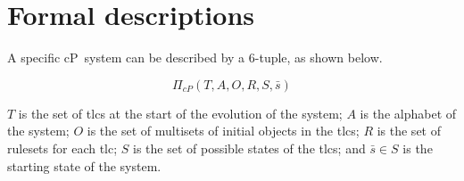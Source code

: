 \section{\label{sec:cps:formaldescriptions}Formal  descriptions}

A specific cP~system can be described by a 6-tuple, as shown below.

\[
\Pi_{cP}(T, A, O, R, S, \bar{s})
\]

\(T\) is the set of \glspl{tlc} at the start of the evolution of the system; \(A\) is the alphabet of the system; \(O\) is the set of multisets of initial objects in the \glspl{tlc}; \(R\) is the set of \glspl{ruleset} for each \gls{tlc}; \(S\) is the set of possible states of the \glspl{tlc}; and \(\bar{s} \in S\) is the starting state of the system.